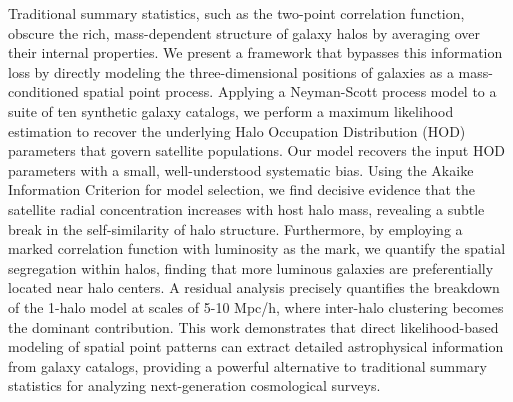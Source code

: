 \documentclass[]{article}
\begin{document}
Traditional summary statistics, such as the two-point correlation function, obscure the rich, mass-dependent structure of galaxy halos by averaging over their internal properties. We present a framework that bypasses this information loss by directly modeling the three-dimensional positions of galaxies as a mass-conditioned spatial point process. Applying a Neyman-Scott process model to a suite of ten synthetic galaxy catalogs, we perform a maximum likelihood estimation to recover the underlying Halo Occupation Distribution (HOD) parameters that govern satellite populations. Our model recovers the input HOD parameters with a small, well-understood systematic bias. Using the Akaike Information Criterion for model selection, we find decisive evidence that the satellite radial concentration increases with host halo mass, revealing a subtle break in the self-similarity of halo structure. Furthermore, by employing a marked correlation function with luminosity as the mark, we quantify the spatial segregation within halos, finding that more luminous galaxies are preferentially located near halo centers. A residual analysis precisely quantifies the breakdown of the 1-halo model at scales of 5-10 Mpc/h, where inter-halo clustering becomes the dominant contribution. This work demonstrates that direct likelihood-based modeling of spatial point patterns can extract detailed astrophysical information from galaxy catalogs, providing a powerful alternative to traditional summary statistics for analyzing next-generation cosmological surveys.
\end{document}
